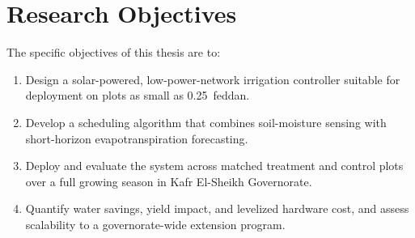 \section{Research Objectives}
The specific objectives of this thesis are to:
\begin{enumerate}[label=\textbf{O\arabic*.}, leftmargin=2.2em]
\item Design a solar-powered, low-power-network irrigation controller suitable for
      deployment on plots as small as 0.25~feddan.
\item Develop a scheduling algorithm that combines soil-moisture sensing with short-horizon
      evapotranspiration forecasting.
\item Deploy and evaluate the system across matched treatment and control plots over a full
      growing season in Kafr El-Sheikh Governorate.
\item Quantify water savings, yield impact, and levelized hardware cost, and assess
      scalability to a governorate-wide extension program.
\end{enumerate}
